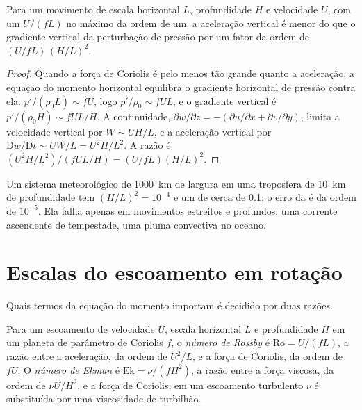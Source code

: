 \begin{proposition}\label{prop:b3:gfd-foundations:hydrostatic}
Para um movimento de escala horizontal $L$, profundidade $H$ e velocidade $U$, com um
 $U/(fL)$ no máximo da ordem de um, a aceleração vertical é
menor do que o gradiente vertical da perturbação de pressão por um fator
da ordem de $(U/fL)\,(H/L)^2$.
\end{proposition}

\begin{proof}
Quando a força de Coriolis é pelo menos tão grande quanto a aceleração, a
equação do momento horizontal equilibra o gradiente horizontal de pressão
contra ela: $p'/(\rho_0 L) \sim fU$, logo $p'/\rho_0 \sim fUL$, e o gradiente
vertical é $p'/(\rho_0 H) \sim fUL/H$. A continuidade, $\partial w/\partial z
= -(\partial u/\partial x + \partial v/\partial y)$, limita a velocidade
vertical por $W \sim UH/L$, e a aceleração vertical por
$\mathrm Dw/\mathrm Dt \sim UW/L = U^2H/L^2$. A razão é $(U^2H/L^2)/(fUL/H)
= (U/fL)(H/L)^2$.
\end{proof}

Um sistema meteorológico de \qty{1000}{km} de largura em uma troposfera de \qty{10}{km}
de profundidade tem $(H/L)^2 = 10^{-4}$ e um  de cerca de 0.1: o
erro da  é da ordem de $10^{-5}$. Ela falha apenas em movimentos
estreitos e profundos: uma corrente ascendente de tempestade, uma pluma convectiva no oceano.

\section{Escalas do escoamento em rotação}\label{sec:b3:gfd-foundations:scales}

Quais termos da equação do momento importam é decidido por duas razões.

\begin{definition}\label{def:b3:gfd-foundations:numbers}
Para um escoamento de velocidade $U$, escala horizontal $L$ e profundidade $H$ em um planeta de
parâmetro de Coriolis $f$, o \emph{número de Rossby} é
$\mathrm{Ro} = U/(fL)$, a razão entre a aceleração, da ordem de $U^2/L$,
e a força de Coriolis, da ordem de $fU$. O \emph{número de
Ekman} é $\mathrm{Ek} = \nu/(fH^2)$, a razão entre
a força viscosa, da ordem de $\nu U/H^2$, e a força de Coriolis; em um
escoamento turbulento $\nu$ é substituída por uma viscosidade de turbilhão.
\end{definition}

